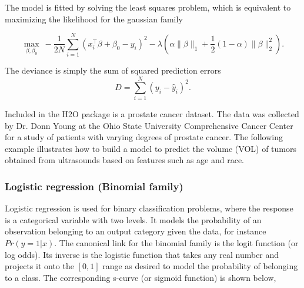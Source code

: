 The model is fitted by solving the least squares problem, which is equivalent to maximizing the likelihood for the gaussian family

$$ \max_{\beta,\beta_0} \ - \frac{1}{2N} \sum_{i=1}^N  (x_i^{\top}\beta + \beta_0 - y_i)^2  - \lambda \left(  \alpha \|\beta \|_1 +  \frac{1}{2} (1- \alpha) \| \beta \|_2^2 \right).$$

The deviance is simply the sum of squared prediction errors
$$ D = \sum_{i=1}^{N} (y_i - \hat{y}_i)^2 . $$

\waterExampleInR

Included in the H2O package is a prostate cancer dataset. The data was collected by Dr. Donn Young at the Ohio State
University Comprehensive Cancer Center for a study of patients with varying degrees of prostate cancer. The
following example illustrates how to build a model to predict the volume (VOL) of tumors obtained from ultrasounds
based on features such as age and race.
\bigskip


\waterExampleInPython


\subsubsection{Logistic regression (Binomial family)}
Logistic regression is used for binary classification problems, where the response is a categorical variable with two
levels. It models the probability of an observation belonging to an output category given the data, for instance $ Pr(y = 1|x)$.
The canonical link for the binomial family is the logit function (or log odds). Its inverse is the logistic function that takes any real number and projects it onto the $[0,1]$ range as desired to model the probability of belonging to a class. The corresponding s-curve (or sigmoid function) is shown below,

